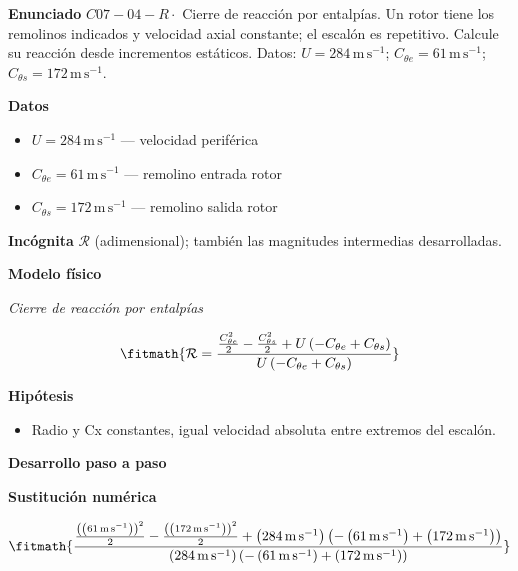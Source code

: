 \documentclass[10pt,openany]{book}
\begin{document}
\begin{tcolorbox}[title={Problema resuelto 4}, studiumworked, breakable]

\noindent\textbf{Enunciado}
\(C07-04-R \cdot\) Cierre de reacción por entalpías. Un rotor tiene los remolinos indicados y velocidad axial constante; el escalón es repetitivo. Calcule su reacción desde incrementos estáticos. Datos: \(U=284\, \mathrm{m}\,\mathrm{s}^{-1}\); \(C_{\theta e}=61\, \mathrm{m}\,\mathrm{s}^{-1}\); \(C_{\theta s}=172\, \mathrm{m}\,\mathrm{s}^{-1}\).

\noindent\textbf{Datos}
\begin{itemize}
\item $U = 284\,\mathrm{m}\,\mathrm{s}^{-1}$ — velocidad periférica
\item $C_{\theta e} = 61\,\mathrm{m}\,\mathrm{s}^{-1}$ — remolino entrada rotor
\item $C_{\theta s} = 172\,\mathrm{m}\,\mathrm{s}^{-1}$ — remolino salida rotor
\end{itemize}

\noindent\textbf{Incógnita}
$\mathcal{R}$ (adimensional); también las magnitudes intermedias desarrolladas.

\noindent\textbf{Modelo físico}

\noindent\textit{Cierre de reacción por entalpías}

\[
\fitmath{\mathcal R=\frac{\frac{C_{\theta e}^{2}}{2} - \frac{C_{\theta s}^{2}}{2} + U \left(- C_{\theta e} + C_{\theta s}\right)}{U \left(- C_{\theta e} + C_{\theta s}\right)}}
\]

\noindent\textbf{Hipótesis}
\begin{itemize}
\item Radio y Cx constantes, igual velocidad absoluta entre extremos del escalón.
\end{itemize}

\noindent\textbf{Desarrollo paso a paso}



\noindent\textbf{Sustitución numérica}

\[
\fitmath{\frac{\frac{\left(\left(61\,\mathrm{m}\,\mathrm{s}^{-1}\right)\right)^{2}}{2} - \frac{\left(\left(172\,\mathrm{m}\,\mathrm{s}^{-1}\right)\right)^{2}}{2} + \left(284\,\mathrm{m}\,\mathrm{s}^{-1}\right) \left(- \left(61\,\mathrm{m}\,\mathrm{s}^{-1}\right) + \left(172\,\mathrm{m}\,\mathrm{s}^{-1}\right)\right)}{\left(284\,\mathrm{m}\,\mathrm{s}^{-1}\right) \left(- \left(61\,\mathrm{m}\,\mathrm{s}^{-1}\right) + \left(172\,\mathrm{m}\,\mathrm{s}^{-1}\right)\right)}}
\]


\end{tcolorbox}
\end{document}
